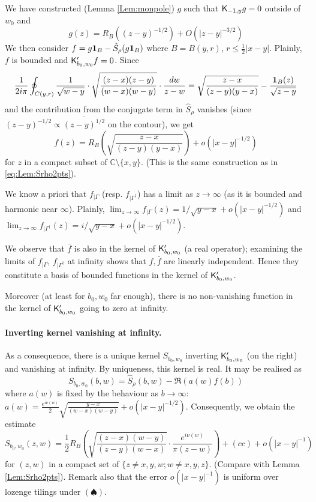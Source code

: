 \documentclass[10pt]{article}
\newcommand{\C}{\mathbb{C}}
\newcommand{\ind}{{\bf 1}}
\newcommand{\rK}{{\sf K}}
\newcommand{\dg}{\dagger}
\begin{document}
We have constructed (Lemma \ref{Lem:monpole}) $g$ such that $\rK_{-1,y}g=0$ outside of $w_0$ and 
$$g(z)=R_B((z-y)^{-1/2})+O(|z-y|^{-3/2})$$
We then consider $f=g\ind_B-\hat S_\rho(g\ind_B)$ where $B=B(y,r)$, $r\leq \frac 12|x-y|$. Plainly, $f$ is bounded and $\rK_{b_0,w_0}'f=0$. Since
$$\frac 1{2i\pi}\oint_{C(y,r)}\frac{1}{\sqrt{w-y}}\cdot\sqrt{\frac{(z-x)(z-y)}{(w-x)(w-y)}}\cdot\frac{dw}{z-w}=\sqrt\frac{z-x}{(z-y)(y-x)}-\frac{\ind_B(z)}{\sqrt{z-y}}$$
and the contribution from the conjugate term in $\hat S_\rho$ vanishes (since $(z-y)^{-1/2}\propto \overline{(z-y)^{1/2}}$ on the contour), we get
$$f(z)=R_B\left(\sqrt{\frac{z-x}{(z-y)(y-x)}}\right)+o(|x-y|^{-1/2})$$
for $z$ in a compact subset of $\C\setminus\{x,y\}$. (This is the same construction as in \eqref{eq:Lem:Srho2pts}). 

We know a priori that $f_{|\Gamma}$ (resp. $f_{|\Gamma^\dg}$) has a limit as $z\rightarrow\infty$ (as it is bounded and harmonic near $\infty$). Plainly, $\lim_{z\rightarrow\infty}f_{|\Gamma}(z)=1/\sqrt{y-x}+o(|x-y|^{-1/2})$ and $\lim_{z\rightarrow\infty}f_{|\Gamma^\dg}(z)=i/\sqrt{y-x}+o(|x-y|^{-1/2})$.

We observe that $\bar f$ is also in the kernel of $\rK'_{b_0,w_0}$ (a real operator); examining the limits of $f_{|\Gamma}$, $f_{|\Gamma^\dg}$ at infinity shows that $f,\bar f$ are linearly independent. Hence they constitute a basis of bounded functions in the kernel of $\rK'_{b_0,w_0}$.

Moreover (at least for $b_0,w_0$ far enough), there is no non-vanishing function in the kernel of $\rK'_{b_0,w_0}$ going to zero at infinity.


\paragraph{Inverting kernel vanishing at infinity.\\}

As a consequence, there is a unique kernel $S_{b_0,w_0}$ inverting $\rK'_{b_0,w_0}$ (on the right) and vanishing at infinity. By uniqueness, this kernel is real. It may be realised as
$$S_ {b_0,w_0}(b,w)=\hat S_\rho(b,w)-\Re(a(w)f(b))$$
where $a(w)$ is fixed by the behaviour as $b\rightarrow\infty$: $a(w)=\frac{e^{i\nu(w)}}2\sqrt{\frac{y-x}{(w-x)(w-y)}}+o(|x-y|^{-1/2})$. Consequently, we obtain the estimate
\begin{equation}\label{eq:magnpairker}
S_ {b_0,w_0} (z,w)=\frac 12R_B\left(\sqrt{\frac{(z-x)(w-y)}{(z-y)(w-x)}}\cdot \frac{e^{i\nu(w)}}{\pi(z-w)}\right)+(cc)+o(|x-y|^{-1})
\end{equation}
for $(z,w)$ in a compact set of $\{z\neq x,y,w;w\neq x,y,z\}$. (Compare with Lemma \ref{Lem:Srho2pts}). Remark also that the error $o(|x-y|^{-1})$ is uniform over lozenge tilings under $(\spadesuit)$. 
\end{document}
